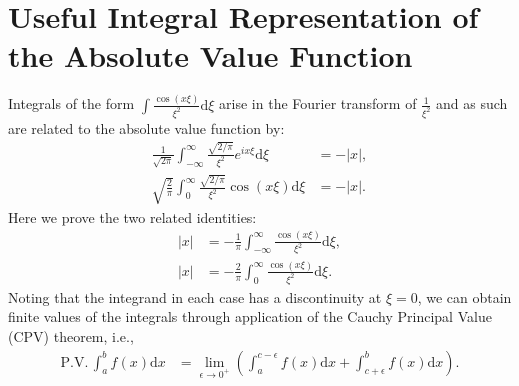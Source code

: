 \section{Useful Integral Representation of the Absolute Value Function}
Integrals of the form $\int \! \frac{\cos(x \xi)}{\xi^2} \mathrm{d}\xi$ arise in the
Fourier transform of $\frac{1}{\xi^2}$ and as such are related to the
absolute value function by:
\begin{align}
	\frac{1}{\sqrt{2 \pi}} \int_{-\infty}^{\infty} \frac{\sqrt{2/\pi}}{\xi^2}e^{i x \xi} \mathrm{d}\xi
	    &= -|x|, \\
	\sqrt{\frac{2}{\pi}} \int_{0}^{\infty} \frac{\sqrt{2/\pi}}{\xi^2}\cos(x \xi) \mathrm{d}\xi
	    &= -|x|.
\end{align}
Here we prove the two related identities:
\begin{align}
	|x| &= -\frac{1}{\pi} \int_{-\infty}^{\infty} \! \frac{\cos(x \xi)}{\xi^2} \mathrm{d}\xi, \label{eq_cos_rat_minf_inf} \\
	|x| &= -\frac{2}{\pi} \int_{0}^{\infty} \! \frac{\cos(x \xi)}{\xi^2} \mathrm{d}\xi. \label{eq_cos_rat_0_inf}
\end{align}
Noting that the integrand in each case has a discontinuity at $\xi=0$, we can obtain finite values of
the integrals through application of the Cauchy Principal Value (CPV) theorem, i.e.,
\begin{align}
	\mathrm{P.V.} \, \int_a^b \!  f(x) \mathrm{d}x
	    &= \lim_{\epsilon \to 0^+} \left(
	        \int_a^{c-\epsilon} \! f(x) \mathrm{d}x + \int_{c+\epsilon}^{b} f(x) \mathrm{d}x
	    \right).
\end{align}

